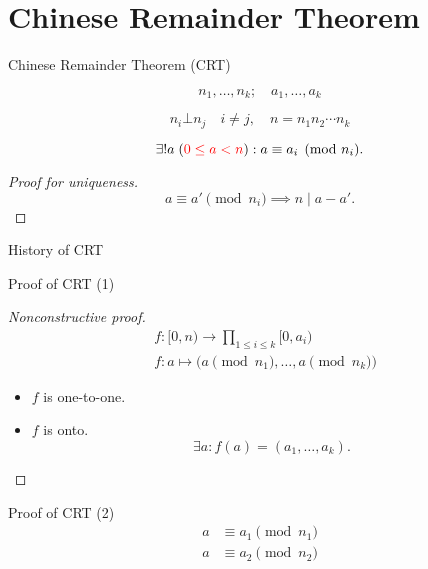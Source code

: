 \section{Chinese Remainder Theorem}

\begin{frame}{Chinese Remainder Theorem (CRT)}
  \begin{theorem}[CRT]
	\[
	  n_1, \ldots, n_k; \quad a_1, \ldots, a_k
	\]

	\[ 
	  n_i \bot n_j \quad i \neq j, \quad n = n_1n_2\cdots n_k 
	\]

    \[
	  \exists! a\; (\textcolor{red}{0 \le a < n}): a \equiv a_i \pmod{n_i}.
	\]
  \end{theorem}

  \begin{proof}[Proof for uniqueness]
	\[
	  a \equiv a' \pmod{n_i} \implies n \mid a - a'.
	\]
  \end{proof}
\end{frame}
\begin{frame}{History of CRT}
  \begin{quote}
  \end{quote}
\end{frame}
\begin{frame}{Proof of CRT (1)}
  \begin{proof}[Nonconstructive proof]
	\begin{align*}
	  &f: [0,n) \to \prod_{1 \le i \le k} [0,a_i) \\
	  &f: a \mapsto \big( a \pmod{n_1}, \dots, a \pmod{n_k} \big)
	\end{align*}

	\begin{itemize}
	  \item $f$ is one-to-one.
	  \item $f$ is onto.
		\[
		  \exists a: f(a) = (a_1, \dots, a_k).
		\]
	\end{itemize}
  \end{proof}
\end{frame}
\begin{frame}{Proof of CRT (2)}
  \begin{align*}
	a &\equiv a_1 \pmod{n_1} \\
	a &\equiv a_2 \pmod{n_2}
  \end{align*}
\end{frame}
